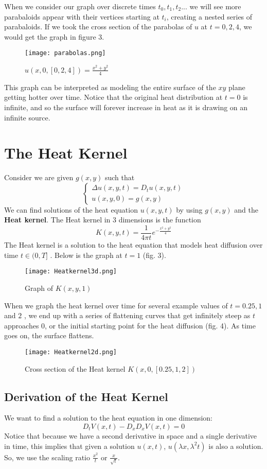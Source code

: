 \documentclass[12pt]{article}
\theoremstyle{plain}
\theoremstyle{definition}
\theoremstyle{remark}
\begin{document}
When we consider our graph over discrete times $t_0, t_1, t_2...$ we will see more parabaloids appear with their vertices starting at $t_i$,  creating a nested series of parabaloids. If we took the cross section of the parabolas of $u$ at $t=0, 2, 4$, we would get the graph in figure 3.
\begin{figure}[ht]
\caption{$u(x, 0, [0, 2, 4]) = \frac{x^2+y^2}{4}$}
\centering
\texttt{[image: parabolas.png]}

\end{figure}
This graph can be interpreted as modeling the entire surface of the $xy$ plane getting hotter over time. Notice that the original heat distribution at $t=0$ is infinite, and so the surface will forever increase in heat as it is drawing on an infinite source. 

\section{The Heat Kernel}
Consider we are given $g(x, y)$ such that $$\begin{cases}
    \Delta u(x, y, t) = D_t u(x, y, t)\\
    u(x, y, 0) = g(x, y) 
\end{cases}$$
We can find solutions of the heat equation $u(x, y, t)$ by using $g(x, y)$ and the \textbf{Heat kernel}.
 The Heat kernel in 3 dimensions is the function $$K(x, y, t) = \frac{1}{4\pi t} e^{-\frac{x^2 + y^2}{4}}$$
The Heat kernel is a solution to the heat equation that models heat diffusion over time $t \in (0, T]$ . Below is the graph at $t=1$ (fig. 3). 
\begin{figure}[ht]
\caption{Graph of $K(x, y, 1)$}
\centering
\texttt{[image: Heatkernel3d.png]}
\end{figure}
When we graph the heat kernel over time for several example values of $t = 0.25, 1$ and $ 2$ , we end up with a series of flattening curves that get infinitely steep as $t$ approaches 0, or the initial starting point for the heat diffusion (fig. 4). As time goes on, the surface flattens. 
\begin{figure}[ht]
\centering
\texttt{[image: Heatkernel2d.png]}
\caption{Cross section of the Heat kernel $K(x, 0, [0.25, 1, 2])$}
\end{figure}

\color{black}
 \subsection{Derivation of the Heat Kernel}
 We want to find a solution to the heat equation in one dimension: $$D_t V(x, t) - D_xD_xV(x, t) = 0$$
 Notice that because we have a second derivative in space and a single derivative in time, this implies that given a solution $u(x, t)$, $u(\lambda x, \lambda^2 t)$ is also a solution. So, we 
 use the scaling ratio $\frac{x^2}{t}$ or $\frac{x}{\sqrt{t}}$. 
 
\end{document}
